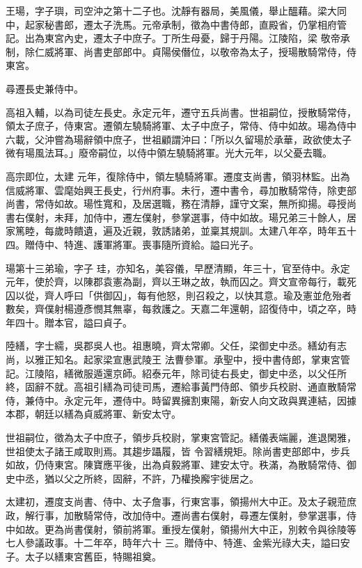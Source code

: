 \begin{pinyinscope}
 王瑒，字子璵，司空沖之第十二子也。沈靜有器局，美風儀，舉止醞藉。梁大同中，起家秘書郎，遷太子洗馬。元帝承制，徵為中書侍郎，直殿省，仍掌相府管記。出為東宮內史，遷太子中庶子。丁所生母憂，歸于丹陽。江陵陷，梁
 敬帝承制，除仁威將軍、尚書吏部郎中。貞陽侯僭位，以敬帝為太子，授瑒散騎常侍，侍東宮。



 尋遷長史兼侍中。



 高祖入輔，以為司徒左長史。永定元年，遷守五兵尚書。世祖嗣位，授散騎常侍，領太子庶子，侍東宮。遷領左驍騎將軍、太子中庶子，常侍、侍中如故。瑒為侍中六載，父沖嘗為瑒辭領中庶子，世祖顧謂沖曰：「所以久留瑒於承華，政欲使太子微有瑒風法耳。」廢帝嗣位，以侍中領左驍騎將軍。光大元年，以父憂去職。



 高宗即位，太建
 元年，復除侍中，領左驍騎將軍。遷度支尚書，領羽林監。出為信威將軍、雲麾始興王長史，行州府事。未行，遷中書令，尋加散騎常侍，除吏部尚書，常侍如故。瑒性寬和，及居選職，務在清靜，謹守文案，無所抑揚。尋授尚書右僕射，未拜，加侍中，遷左僕射，參掌選事，侍中如故。瑒兄弟三十餘人，居家篤睦，每歲時饋遺，遍及近親，敦誘諸弟，並稟其規訓。太建八年卒，時年五十四。贈侍中、特進、護軍將軍。喪事隨所資給。謚曰光子。



 瑒第十三弟瑜，字子
 珪，亦知名，美容儀，早歷清顯，年三十，官至侍中。永定元年，使於齊，以陳郡袁憲為副，齊以王琳之故，執而囚之。齊文宣帝每行，載死囚以從，齊人呼曰「供御囚」，每有他怒，則召殺之，以快其意。瑜及憲並危殆者數矣，齊僕射楊遵彥憫其無辜，每救護之。天嘉二年還朝，詔復侍中，頃之卒，時年四十。贈本官，謚曰貞子。



 陸繕，字士繻，吳郡吳人也。祖惠曉，齊太常卿。父任，梁御史中丞。繕幼有志尚，以雅正知名。起家梁宣惠武陵王
 法曹參軍。承聖中，授中書侍郎，掌東宮管記。江陵陷，繕微服遁還京師。紹泰元年，除司徒右長史，御史中丞，以父任所終，固辭不就。高祖引繕為司徒司馬，遷給事黃門侍郎、領步兵校尉、通直散騎常侍，兼侍中。永定元年，遷侍中。時留異擁割東陽，新安人向文政與異連結，因據本郡，朝廷以繕為貞威將軍、新安太守。



 世祖嗣位，徵為太子中庶子，領步兵校尉，掌東宮管記。繕儀表端麗，進退閑雅，世祖使太子諸王咸取則焉。其趨步躡履，皆
 令習繕規矩。除尚書吏部郎中，步兵如故，仍侍東宮。陳寶應平後，出為貞毅將軍、建安太守。秩滿，為散騎常侍、御史中丞，猶以父之所終，固辭，不許，乃權換廨宇徙居之。



 太建初，遷度支尚書、侍中、太子詹事，行東宮事，領揚州大中正。及太子親蒞庶政，解行事，加散騎常侍，改加侍中。遷尚書右僕射，尋遷左僕射，參掌選事，侍中如故。更為尚書僕射，領前將軍。重授左僕射，領揚州大中正，別敕令與徐陵等七人參議政事。十二年卒，時年六十
 三。贈侍中、特進、金紫光祿大夫，謚曰安子。太子以繕東宮舊臣，特賜祖奠。




\end{pinyinscope}
